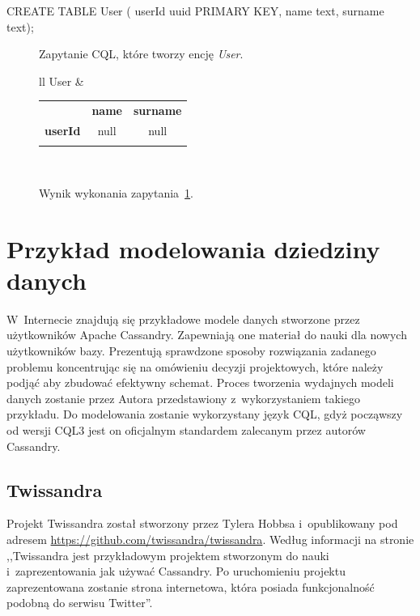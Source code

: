 \begin{verbbox}
	CREATE TABLE User (
	    userId uuid PRIMARY KEY,
	    name text,
	    surname text);
\end{verbbox}

\begin{figure}[ht!]
	\centering
	\theverbbox

	\caption{Zapytanie CQL, które tworzy encję \emph{User}.}
	\label{lst:cql_example}
\end{figure}

\begin{figure}[ht!]
	\centering

	\begin{tabular}{ll}
		User &
		\begin{tabular}{|l||c|c|}
			\hhline{|-||--|}
			 & \textbf{name} & \textbf{surname} \\
			\hhline{|~||==|}
			\textbf{userId} & null & null \\
			\hhline{|-||--|}
		\end{tabular} \\
	\end{tabular}

	\caption{Wynik wykonania zapytania~\ref{lst:cql_example}.}
	\label{tab:cql_example_query_result}
\end{figure}

\section{Przykład modelowania dziedziny danych}
\label{sec:cassandra_modelling_examples}

W~Internecie znajdują się przykładowe modele danych stworzone przez użytkowników Apache Cassandry. Zapewniają one materiał do nauki dla nowych użytkowników bazy. Prezentują sprawdzone sposoby rozwiązania zadanego problemu koncentrując się na omówieniu decyzji projektowych, które należy podjąć aby zbudować efektywny schemat. Proces tworzenia wydajnych modeli danych zostanie przez Autora przedstawiony z~wykorzystaniem takiego przykładu. Do modelowania zostanie wykorzystany język CQL, gdyż począwszy od wersji CQL3 jest on oficjalnym standardem zalecanym przez autorów Cassandry. 

\subsection{Twissandra}
\label{sec:twissandra}

Projekt Twissandra został stworzony przez Tylera Hobbsa i~opublikowany pod adresem \url{https://github.com/twissandra/twissandra}. Według informacji na stronie ,,Twissandra jest przykładowym projektem stworzonym do nauki i~zaprezentowania jak używać Cassandry. Po uruchomieniu projektu zaprezentowana zostanie strona internetowa, która posiada funkcjonalność podobną do serwisu Twitter''.~\cite{twissandra} 


